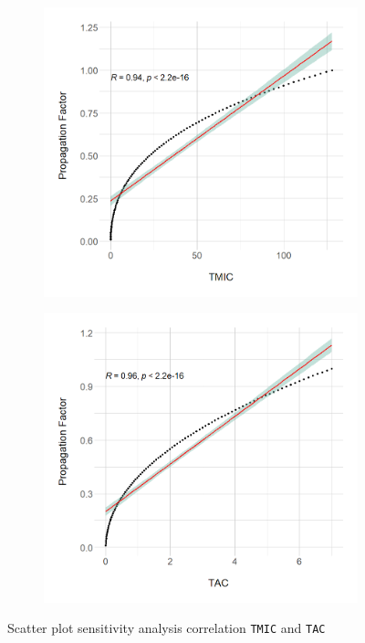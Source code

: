 \begin{figure}[ht!]
\begin{center}
  \begin{subfigure}[b]{0.7\textwidth}
    \includegraphics[width=\textwidth]{figures/results/Rplot_spoon-core_eclipse-osgi_TMIC.png}
  \end{subfigure}
  \begin{subfigure}[b]{0.7\textwidth}
    \includegraphics[width=\textwidth]{figures/results/Rplot_spoon-core_eclipse-osgi_TAC.png}
  \end{subfigure}
\caption{Scatter plot sensitivity analysis correlation \texttt{TMIC} and \texttt{TAC}}
\label{fig:correlation-sensitivity}
\end{center}
\end{figure}

